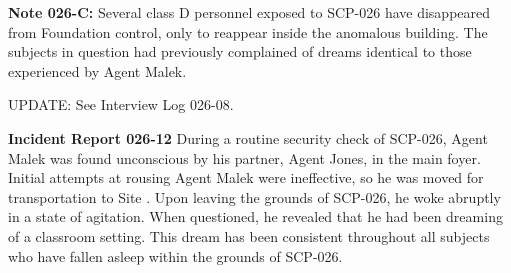 \textbf{Note 026-C:} Several class D personnel exposed to SCP-026 have disappeared from Foundation control, only to reappear inside the anomalous building. The subjects in question had previously complained of dreams identical to those experienced by Agent Malek.

UPDATE: See Interview Log 026-08.

\textbf{Incident Report 026-12}
During a routine security check of SCP-026, Agent Malek was found unconscious by his partner, Agent Jones, in the main foyer. Initial attempts at rousing Agent Malek were ineffective, so he was moved for transportation to Site . Upon leaving the grounds of SCP-026, he woke abruptly in a state of agitation. When questioned, he revealed that he had been dreaming of a classroom setting. This dream has been consistent throughout all subjects who have fallen asleep within the grounds of SCP-026.